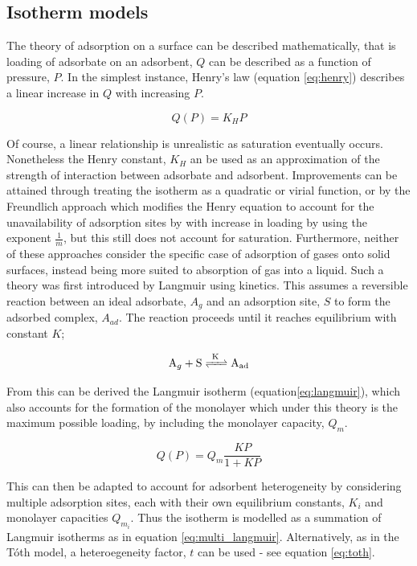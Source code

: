 \subsection{Isotherm models}

The theory of adsorption on a surface can be described mathematically, that is loading of \gls{adsorbate} on an \gls{adsorbent}, $Q$ can be described as a function of pressure, $P$. In the simplest instance, Henry's law\citep{henry1803experiments} (equation \ref{eq:henry}) describes a linear increase in $Q$ with increasing $P$.

\begin{equation}\label{eq:henry}
    Q(P) = K_H P
\end{equation}

Of course, a linear relationship is unrealistic as saturation eventually occurs. Nonetheless the Henry constant, $K_H$ an be used as an approximation of the strength of interaction between \gls{adsorbate} and \gls{adsorbent}. Improvements can be attained through treating the isotherm as a quadratic or virial function, or by the Freundlich approach which modifies the Henry equation to account for the unavailability of adsorption sites by with increase in loading by using the exponent $\frac{1}{m}$, but this still does not account for saturation. Furthermore, neither of these approaches consider the specific case of adsorption of gases onto solid surfaces, instead being more suited to absorption of gas into a liquid. Such a theory was first introduced by Langmuir using kinetics. This assumes a reversible reaction between an ideal \gls{adsorbate}, $A_g$ and an \gls{adsorption} site, $S$ to form the adsorbed complex, $A_{ad}$. The reaction proceeds until it reaches equilibrium with constant $K$;

\begin{equation}
    \ce{A_g + S <=>[K] A_{ad}}
\end{equation}

From this can be derived the Langmuir isotherm (equation\ref{eq:langmuir}), which also accounts for the formation of the monolayer which under this theory is the maximum possible loading, by including the monolayer capacity, $Q_m$.

\begin{equation}\label{eq:langmuir}
    Q(P) = Q_m \frac{K P}{1 + K P}
\end{equation}

This can then be adapted to account for \gls{adsorbent} heterogeneity by considering multiple \gls{adsorption} sites, each with their own equilibrium constants, $K_i$ and monolayer capacities $Q_{m_i}$. Thus the isotherm is modelled as a summation of Langmuir isotherms as in equation \ref{eq:multi_langmuir}. Alternatively, as in the T\'{o}th model, a heteroegeneity factor, $t$ can be used - see equation \ref{eq:toth}. 

